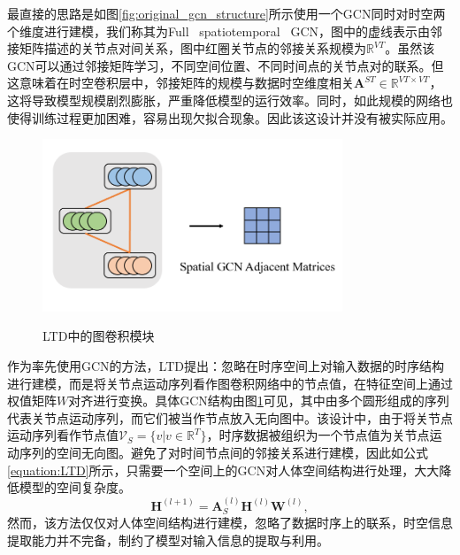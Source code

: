 最直接的思路是如图\ref{fig:original_gcn_structure}所示使用一个GCN同时对时空两个维度进行建模，我们称其为Full \ spatiotemporal \ GCN，图中的虚线表示由邻接矩阵描述的关节点对间关系，图中红圈关节点的邻接关系规模为$\mathbb{R}^{VT}$。虽然该GCN可以通过邻接矩阵学习，不同空间位置、不同时间点的关节点对的联系。但这意味着在时空卷积层中，邻接矩阵的规模与数据时空维度相关$\mathbf{A}^{ST} \in \mathbb{R}^{VT\times VT}$，这将导致模型规模剧烈膨胀，严重降低模型的运行效率。同时，如此规模的网络也使得训练过程更加困难，容易出现欠拟合现象。因此该这设计并没有被实际应用。

\begin{figure}[ht]
    \centering
    \includegraphics[width=0.8\textwidth]{FigMa/LTD_gcn.png}\\
    \vspace{-0.3cm}
    \caption{LTD中的图卷积模块}
    \label{fig:LTD_gcn_structure}
\end{figure}

作为率先使用GCN的方法，LTD提出：忽略在时序空间上对输入数据的时序结构进行建模，而是将关节点运动序列看作图卷积网络中的节点值，在特征空间上通过权值矩阵$W$对齐进行变换。具体GCN结构由图\ref{fig:LTD_gcn_structure}可见，其中由多个圆形组成的序列代表关节点运动序列，而它们被当作节点放入无向图中。该设计中，由于将关节点运动序列看作节点值$\mathcal{V}_S = \{v | v \in \mathbb{R}^{T} \}$，时序数据被组织为一个节点值为关节点运动序列的空间无向图。避免了对时间节点间的邻接关系进行建模，因此如公式\ref{equation:LTD}所示，只需要一个空间上的GCN对人体空间结构进行处理，大大降低模型的空间复杂度。
\begin{equation}
    \mathbf{H}^{(l+1)}= \mathbf{A}_{S}^{(l)}\mathbf{H}^{(l)}\mathbf{W}^{(l)},
    \label{equation:LTD}
\end{equation}
然而，该方法仅仅对人体空间结构进行建模，忽略了数据时序上的联系，时空信息提取能力并不完备，制约了模型对输入信息的提取与利用。

